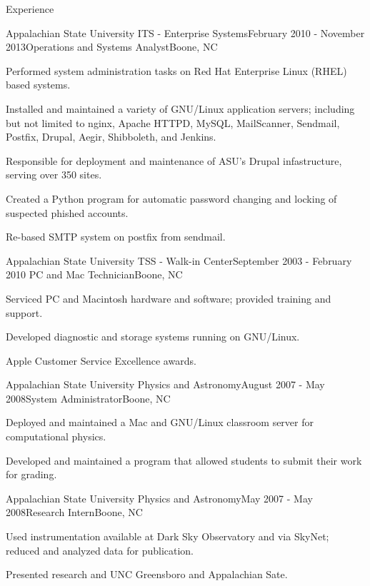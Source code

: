 \documentclass{cv} %
\begin{document}
\begin{rSection}{Experience}
\begin{rSubsection}{Appalachian State University ITS - Enterprise Systems}{February 2010 - November 2013}{Operations and Systems Analyst}{Boone, NC}
\item Performed system administration tasks on Red Hat Enterprise Linux (RHEL) based systems.
\item Installed and maintained a variety of GNU/Linux application servers; including but not limited to nginx, Apache HTTPD, MySQL, MailScanner, Sendmail, Postfix, Drupal, Aegir, Shibboleth, and Jenkins.
\item Responsible for deployment and maintenance of ASU's Drupal infastructure, serving over 350 sites.
\item Created a Python program for automatic password changing and locking of suspected phished accounts.
\item Re-based SMTP system on postfix from sendmail. 
\end{rSubsection}


\begin{rSubsection}{Appalachian State University TSS - Walk-in Center}{September 2003 - February 2010
}{PC and Mac Technician}{Boone, NC}
\item Serviced PC and Macintosh hardware and software; provided training and support.
\item Developed diagnostic and storage systems running on GNU/Linux.
\item Apple Customer Service Excellence awards.
\end{rSubsection}

\begin{rSubsection}{Appalachian State University Physics and Astronomy}{August 2007 - May 2008}{System Administrator}{Boone, NC}
\item Deployed and maintained a Mac and GNU/Linux classroom server for computational physics.
\item Developed and maintained a program that allowed students to submit their work for grading.
\end{rSubsection}

\begin{rSubsection}{Appalachian State University Physics and Astronomy}{May 2007 - May 2008}{Research Intern}{Boone, NC}
\item Used instrumentation available at Dark Sky Observatory and via SkyNet; reduced and analyzed data for publication.
\item Presented research and UNC Greensboro and Appalachian Sate.
\end{rSubsection}


\end{rSection}
\end{document}

